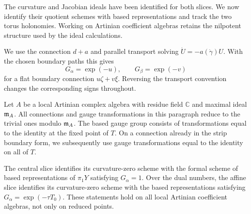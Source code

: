 The curvature and Jacobian ideals have been identified for both slices.
We now identify their quotient schemes with based representations and
track the two torus holonomies. Working on Artinian coefficient algebras
retains the nilpotent structure used by the ideal calculations.

We use the connection $d+a$ and parallel transport solving
$\dot U=-a(\dot\gamma)U$.  With the chosen boundary paths this gives
\begin{equation}
\label{eq:edge-holonomy-sign}
 G_\alpha=\exp(-u),\qquad G_\beta=\exp(-v)
\end{equation}
for a flat boundary connection $u\zeta+v\xi$.  Reversing the transport
convention changes the corresponding signs throughout.

Let $A$ be a local Artinian complex algebra with residue field
$\mathbb C$ and maximal ideal $\mathfrak{m}_A$.  All connections and gauge
transformations in this paragraph reduce to the trivial ones modulo
$\mathfrak{m}_A$.  The based gauge group consists of transformations equal to
the identity at the fixed point of $T$.  On a connection already in
the strip boundary form, we subsequently use gauge transformations
equal to the identity on all of $T$.

\begin{lemma}
\label{lem:edge-based-slice}
The central slice identifies its curvature-zero scheme with the formal
scheme of based representations of $\pi_1Y$ satisfying $G_\alpha=1$.
Over the dual numbers, the affine slice identifies its curvature-zero
scheme with the based representations satisfying
$G_\alpha=\exp(-\tau T_0)$.  These statements hold on all local
Artinian coefficient algebras, not only on reduced points.
\end{lemma}

